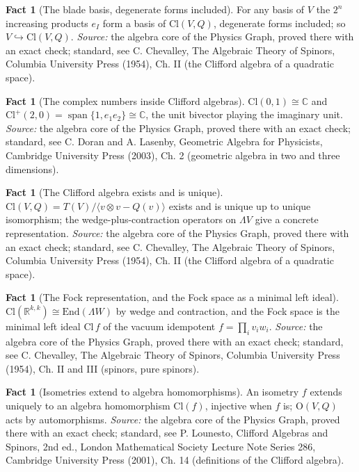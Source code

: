 \documentclass[11pt]{article}
\theoremstyle{definition}
\newtheorem{fact}[theorem]{Fact}
\theoremstyle{plain}
\providecommand{\C}{}\renewcommand{\C}{\mathbb{C}}
\providecommand{\Cl}{}\renewcommand{\Cl}{\mathrm{Cl}}
\providecommand{\End}{}\renewcommand{\End}{\mathrm{End}}
\providecommand{\R}{}\renewcommand{\R}{\mathbb{R}}
\begin{document}
\begin{fact}[The blade basis, degenerate forms included]\label{c:std-algebra.blade-basis}
For any basis of $V$ the $2^{n}$ increasing products $e_I$ form a basis of $\Cl(V, Q)$, degenerate forms included; so $V \hookrightarrow \Cl(V, Q)$.
\emph{Source:} the algebra core of the Physics Graph, proved there with an exact check; standard, see C. Chevalley, The Algebraic Theory of Spinors, Columbia University Press (1954), Ch. II (the Clifford algebra of a quadratic space).
\end{fact}

\begin{fact}[The complex numbers inside Clifford algebras]\label{c:std-algebra.complex-numbers}
$\Cl(0,1) \cong \C$ and $\Cl^{+}(2,0) = \operatorname{span}\{1, e_1 e_2\} \cong \C$, the unit bivector playing the imaginary unit.
\emph{Source:} the algebra core of the Physics Graph, proved there with an exact check; standard, see C. Doran and A. Lasenby, Geometric Algebra for Physicists, Cambridge University Press (2003), Ch. 2 (geometric algebra in two and three dimensions).
\end{fact}

\begin{fact}[The Clifford algebra exists and is unique]\label{c:std-algebra.existence-uniqueness}
$\Cl(V, Q) = T(V)/\langle v \otimes v - Q(v) \rangle$ exists and is unique up to unique isomorphism; the wedge-plus-contraction operators on $\Lambda V$ give a concrete representation.
\emph{Source:} the algebra core of the Physics Graph, proved there with an exact check; standard, see C. Chevalley, The Algebraic Theory of Spinors, Columbia University Press (1954), Ch. II (the Clifford algebra of a quadratic space).
\end{fact}

\begin{fact}[The Fock representation, and the Fock space as a minimal left ideal]\label{c:std-algebra.fock-representation}
$\Cl(\R^{k,k}) \cong \End(\Lambda W)$ by wedge and contraction, and the Fock space is the minimal left ideal $\Cl\, f$ of the vacuum idempotent $f = \prod_i v_i w_i$.
\emph{Source:} the algebra core of the Physics Graph, proved there with an exact check; standard, see C. Chevalley, The Algebraic Theory of Spinors, Columbia University Press (1954), Ch. II and III (spinors, pure spinors).
\end{fact}

\begin{fact}[Isometries extend to algebra homomorphisms]\label{c:std-algebra.functoriality}
An isometry $f$ extends uniquely to an algebra homomorphism $\Cl(f)$, injective when $f$ is; $\mathrm{O}(V, Q)$ acts by automorphisms.
\emph{Source:} the algebra core of the Physics Graph, proved there with an exact check; standard, see P. Lounesto, Clifford Algebras and Spinors, 2nd ed., London Mathematical Society Lecture Note Series 286, Cambridge University Press (2001), Ch. 14 (definitions of the Clifford algebra).
\end{fact}
\end{document}
